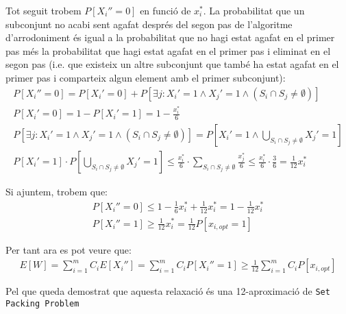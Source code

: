\documentclass[a4paper]{article}
\begin{document}
Tot seguit trobem $P[X_i'' = 0]$ en funció de $x_i^*$. La probabilitat que un subconjunt no acabi sent agafat després del segon pas de l'algoritme d'arrodoniment és igual a la probabilitat que no hagi estat agafat en el primer pas més la probabilitat que hagi estat agafat en el primer pas i eliminat en el segon pas (i.e. que existeix un altre subconjunt que també ha estat agafat en el primer pas i comparteix algun element amb el primer subconjunt):
\begin{gather*}
	P[X_i'' = 0] = P[X_i'=0] + P[\exists j : X_i'=1 \land X_j'=1 \land (S_i \cap S_j \neq \emptyset)] \\
	P[X_i'=0] = 1 - P[X_i'=1] = 1 - \frac{x_i^*}{6} \\
	P[\exists j : X_i'=1 \land X_j'=1 \land (S_i \cap S_j \neq \emptyset)] = P\left[
	X_i'=1 \land \bigcup_{S_i \cap S_j \neq \emptyset} X_j'=1
	\right] \\
	P[X_i'=1] \cdot P\left[\bigcup_{S_i \cap S_j \neq \emptyset} X_j'=1
	\right] \le \frac{x_i^*}{6} \cdot \sum_{S_i \cap S_j \neq \emptyset} \frac{x_j^*}{6} \le \frac{x_i^*}{6} \cdot \frac{3}{6} = 
	\frac{1}{12}x_i^*
\end{gather*}

Si ajuntem, trobem que:
\begin{gather*}
	P[X_i'' = 0] \leq 1 - \frac{1}{6}x_i^*  + \frac{1}{12}x_i^* = 1 - \frac{1}{12}x_i^* \\
	P[X_i'' = 1] \geq \frac{1}{12} x_i^* = \frac{1}{12} P[x_{i,opt} = 1]
\end{gather*}

Per tant ara es pot veure que:
\begin{gather*}
	E[W] = \sum_{i=1}^m C_iE[X_i''] = \sum_{i=1}^m C_iP[X_i''=1] \geq \frac{1}{12} \sum_{i=1}^m C_i P[x_{i,opt}]
\end{gather*}

Pel que queda demostrat que aquesta relaxació és una 12-aproximació de \texttt{Set Packing Problem}
\end{document}
